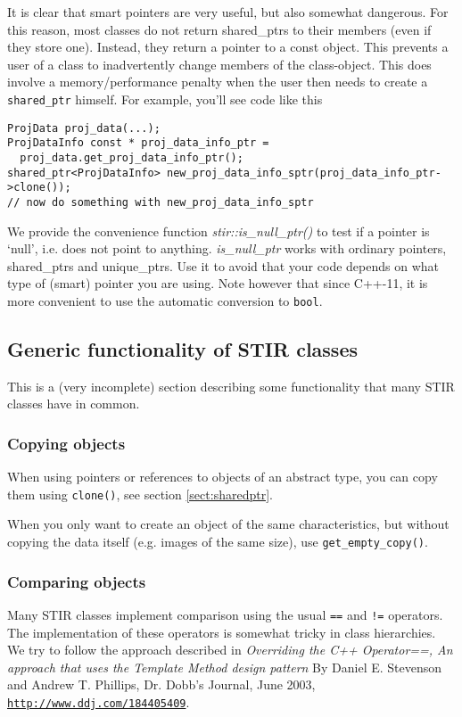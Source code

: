 \documentclass{article}
\def\R2Lurl#1#2{\mbox{\href{#1}{\tt #2}}}
\begin{document}
It is clear that smart pointers are very useful, but also somewhat 
dangerous. For this reason, most classes do not return shared\_ptrs 
to their members (even if they store one). Instead, they return 
a pointer to a const object. This prevents a user of a class 
to inadvertently change members of the class-object. This does 
involve a memory/performance penalty when the user then needs to create 
a \texttt{shared\_ptr} himself. For example, you'll see code like this

\begin{verbatim}
ProjData proj_data(...);
ProjDataInfo const * proj_data_info_ptr = 
  proj_data.get_proj_data_info_ptr();
shared_ptr<ProjDataInfo> new_proj_data_info_sptr(proj_data_info_ptr->clone());
// now do something with new_proj_data_info_sptr
\end{verbatim}


We provide the convenience function \textit{stir::is\_null\_ptr()} 
to test if a pointer is `null', i.e. does not point to anything. \textit{is\_null\_ptr} 
works with ordinary pointers, shared\_ptrs and unique\_ptrs. Use 
it to avoid that your code depends on what type of (smart) pointer 
you are using. Note however that since C++-11, it is more convenient to use the
automatic conversion to \texttt{bool}.

\subsection{Generic functionality of STIR classes}
This is a (very incomplete) section describing some functionality that
many STIR classes have in common.

\subsubsection{Copying objects}
When using pointers or references to objects of an abstract type, you can copy 
them using \texttt{clone()}, see section \ref{sect:sharedptr}.


When you only want to create an object of the same characteristics, but without
copying the data itself (e.g. images of the same size), use \texttt{get\_empty\_copy()}.

\subsubsection{Comparing objects}
Many STIR classes implement comparison using the usual \texttt{==} and 
\texttt{!=} operators. The implementation of these operators is somewhat 
tricky in class hierarchies. We try to follow the approach described in
\textit{Overriding the C++ Operator==, An approach that uses the 
Template Method design pattern} By Daniel E. Stevenson and Andrew T. Phillips,
Dr. Dobb's Journal, June 2003, 
\R2Lurl{http://www.ddj.com/184405409}{http://www.ddj.com/184405409}.
\end{document}
